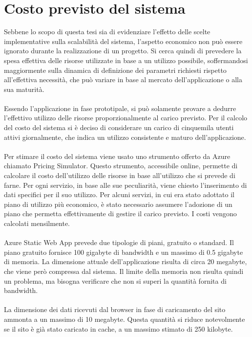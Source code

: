 \section{Costo previsto del sistema}
Sebbene lo scopo di questa tesi sia di evidenziare 
l'effetto delle scelte implementative sulla scalabilità del sistema,
l'aspetto economico non può essere ignorato durante la realizzazione di un progetto.
Si cerca quindi di prevedere la spesa effettiva delle risorse utilizzate in base a un utilizzo possibile,
soffermandosi maggiormente sulla dinamica di definizione dei parametri richiesti 
rispetto all'effettiva necessità, 
che può variare in base al mercato dell'applicazione o alla sua maturità.\\
\\
Essendo l'applicazione in fase prototipale, 
si può solamente provare a dedurre l'effettivo utilizzo delle risorse proporzionalmente al carico previsto.
Per il calcolo del costo del sistema si è deciso di considerare un carico 
di cinquemila utenti attivi giornalmente, 
che indica un utilizzo consistente e maturo dell'applicazione.\\
\\
Per stimare il costo del sistema viene usato uno strumento offerto da Azure chiamato Pricing Simulator.
Questo strumento, accessibile online, 
permette di calcolare il costo dell'utilizzo delle risorse in base all'utilizzo che si prevede di farne.
Per ogni servizio, in base alle sue peculiarità, 
viene chiesto l'inserimento di dati specifici per il suo utilizzo.
Per alcuni servizi, in cui era stato adottato il piano di utilizzo più economico, 
è stato necessario assumere l'adozione di un piano 
che permetta effettivamente di gestire il carico previsto.
I costi vengono calcolati mensilmente.\\
\\
Azure Static Web App prevede due tipologie di piani, gratuito o standard.
Il piano gratuito fornisce 100 gigabyte di bandwidth e 
un massimo di 0.5 gigabyte di memoria.
La dimensione attuale dell'applicazione risulta di circa 20 megabyte,
che viene però compressa dal sistema.
Il limite della memoria non risulta quindi un problema,
ma bisogna verificare che non si superi la quantità fornita di bandwidth.\\
\\
La dimensione dei dati ricevuti dal browser in fase di caricamento del sito 
ammonta a un massimo di 10 megabyte.
Questa quantità si riduce notevolmente se il sito è già stato caricato in cache, 
a un massimo stimato di 250 kilobyte.

